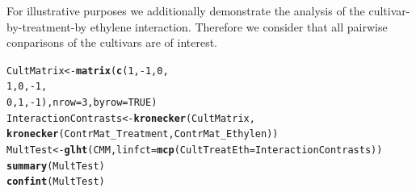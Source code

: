 \documentclass[12pt]{article}\usepackage[]{graphicx}\usepackage[]{color}
\makeatletter
\newcommand{\hlnum}[1]{\textcolor[rgb]{0.686,0.059,0.569}{#1}}%
\newcommand{\hlopt}[1]{\textcolor[rgb]{0,0,0}{#1}}%
\newcommand{\hlstd}[1]{\textcolor[rgb]{0.345,0.345,0.345}{#1}}%
\newcommand{\hlkwb}[1]{\textcolor[rgb]{0.69,0.353,0.396}{#1}}%
\newcommand{\hlkwc}[1]{\textcolor[rgb]{0.333,0.667,0.333}{#1}}%
\newcommand{\hlkwd}[1]{\textcolor[rgb]{0.737,0.353,0.396}{\textbf{#1}}}%
\newenvironment{kframe}{%
 \def\at@end@of@kframe{}%
 \ifinner\ifhmode%
  \def\at@end@of@kframe{\end{minipage}}%
  \begin{minipage}{\columnwidth}%
 \fi\fi%
 \def\FrameCommand##1{\hskip\@totalleftmargin \hskip-\fboxsep
 \colorbox{shadecolor}{##1}\hskip-\fboxsep
     \hskip-\linewidth \hskip-\@totalleftmargin \hskip\columnwidth}%
 \MakeFramed {\advance\hsize-\width
   \@totalleftmargin\z@ \linewidth\hsize
   \@setminipage}}%
 {\par\unskip\endMakeFramed%
 \at@end@of@kframe}
\newenvironment{knitrout}{}{} %
\makeatother
\begin{document}
For illustrative purposes we additionally demonstrate the analysis of the cultivar-by-treatment-by ethylene interaction. Therefore we consider that all pairwise conparisons of the cultivars are of interest. 
\begin{knitrout}
\color{fgcolor}\begin{kframe}
\begin{alltt}
\hlstd{CultMatrix} \hlkwb{<-} \hlkwd{matrix}\hlstd{(}\hlkwd{c}\hlstd{(}\hlnum{1}\hlstd{,} \hlopt{-}\hlnum{1}\hlstd{,} \hlnum{0}\hlstd{,}
                       \hlnum{1}\hlstd{,}  \hlnum{0}\hlstd{,}\hlopt{-}\hlnum{1}\hlstd{,}
                       \hlnum{0}\hlstd{,}  \hlnum{1}\hlstd{,}\hlopt{-}\hlnum{1}\hlstd{),} \hlkwc{nrow}\hlstd{=}\hlnum{3}\hlstd{,} \hlkwc{byrow}\hlstd{=}\hlnum{TRUE}\hlstd{)}
\hlstd{InteractionContrasts}\hlkwb{<-} \hlkwd{kronecker}\hlstd{(CultMatrix,}
                       \hlkwd{kronecker}\hlstd{(ContrMat_Treatment, ContrMat_Ethylen))}
\hlstd{MultTest} \hlkwb{<-} \hlkwd{glht}\hlstd{(CMM,} \hlkwc{linfct}\hlstd{=}\hlkwd{mcp}\hlstd{(}\hlkwc{CultTreatEth}\hlstd{=InteractionContrasts))}
\hlkwd{summary}\hlstd{(MultTest)}
\hlkwd{confint}\hlstd{(MultTest)}
\end{alltt}
\end{kframe}
\end{knitrout}
\end{document}
